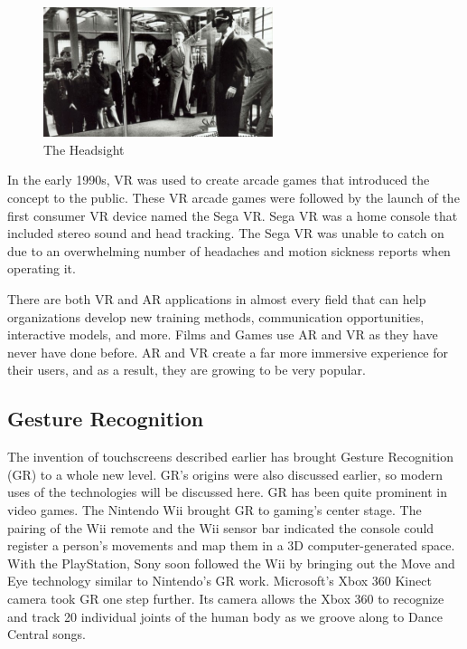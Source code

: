 \documentclass{article}
\begin{document}
\begin{figure}[!ht]
    \caption{The Headsight}
    \label{image:Headsight}
    \centering
    \includegraphics[width=0.6\textwidth]{pics/Headsight.jpg}
\end{figure}

In the early 1990s, VR was used to create arcade games that introduced the concept to the public. These VR arcade games were followed by the launch of the first consumer VR device named the Sega VR. Sega VR was a home console that included stereo sound and head tracking. The Sega VR was unable to catch on due to an overwhelming number of headaches and motion sickness reports when operating it.

There are both VR and AR applications in almost every field that can help organizations develop new training methods, communication opportunities, interactive models, and more. Films and Games use AR and VR as they have never have done before. AR and VR create a far more immersive experience for their users, and as a result, they are growing to be very popular. 
\cite{ref11}

\subsection{Gesture Recognition}
The invention of touchscreens described earlier has brought Gesture Recognition (GR) to a whole new level. GR’s origins were also discussed earlier, so modern uses of the technologies will be discussed here. GR has been quite prominent in video games. The Nintendo Wii brought GR to gaming’s center stage. The pairing of the Wii remote and the Wii sensor bar indicated the console could register a person’s movements and map them in a 3D computer-generated space. With the PlayStation, Sony soon followed the Wii by bringing out the Move and Eye technology similar to Nintendo’s GR work. Microsoft’s Xbox 360 Kinect camera took GR one step further. Its camera allows the Xbox 360 to recognize and track 20 individual joints of the human body as we groove along to Dance Central songs. 
\cite{ref12}
\end{document}
